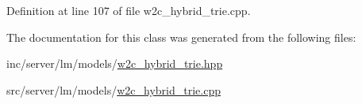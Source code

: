 Definition at line 107 of file w2c\+\_\+hybrid\+\_\+trie.\+cpp.



The documentation for this class was generated from the following files\+:\begin{DoxyCompactItemize}
\item 
inc/server/lm/models/\hyperlink{w2c__hybrid__trie_8hpp}{w2c\+\_\+hybrid\+\_\+trie.\+hpp}\item 
src/server/lm/models/\hyperlink{w2c__hybrid__trie_8cpp}{w2c\+\_\+hybrid\+\_\+trie.\+cpp}\end{DoxyCompactItemize}
